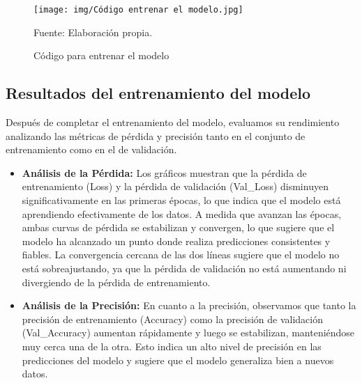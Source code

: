 \begin{figure}[H]
    \begin{minipage}[t]{0.9\textwidth}
        \caption{Código para entrenar el modelo}
        \label{entrenar_modelo}        
    \end{minipage}

    \vspace{10pt}

    \begin{minipage}[b]{1\textwidth}
        \centering
        \texttt{[image: img/Código entrenar el modelo.jpg]}        
    \end{minipage}

    \begin{minipage}[t]{0.9\textwidth}
        Fuente: Elaboración propia.
    \end{minipage}
\end{figure}


\subsection{Resultados del entrenamiento del modelo}

Después de completar el entrenamiento del modelo, evaluamos su rendimiento analizando las métricas de pérdida y precisión tanto en el conjunto de entrenamiento como en el de validación.

\begin{itemize}
    \item \textbf{Análisis de la Pérdida:} Los gráficos muestran que la pérdida de entrenamiento (Loss) y la pérdida de validación (Val\_Loss) disminuyen significativamente en las primeras épocas, lo que indica que el modelo está aprendiendo efectivamente de los datos. A medida que avanzan las épocas, ambas curvas de pérdida se estabilizan y convergen, lo que sugiere que el modelo ha alcanzado un punto donde realiza predicciones consistentes y fiables. La convergencia cercana de las dos líneas sugiere que el modelo no está sobreajustando, ya que la pérdida de validación no está aumentando ni divergiendo de la pérdida de entrenamiento.
    \item \textbf{Análisis de la Precisión:} En cuanto a la precisión, observamos que tanto la precisión de entrenamiento (Accuracy) como la precisión de validación (Val\_Accuracy) aumentan rápidamente y luego se estabilizan, manteniéndose muy cerca una de la otra. Esto indica un alto nivel de precisión en las predicciones del modelo y sugiere que el modelo generaliza bien a nuevos datos.
\end{itemize}

